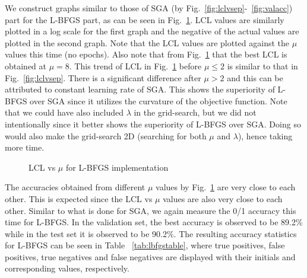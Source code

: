 \documentclass[a4paper]{article}
\begin{document}
We construct graphs similar to those of SGA (by Fig.~\ref{fig:lclvsep}-~\ref{fig:valacc}) part for the L-BFGS part, as can be seen in Fig.~\ref{fig:lbfgsglcl}. LCL values are similarly plotted in a log scale for the first graph and the negative of the actual values are plotted in the second graph. Note that the LCL values are plotted against the $\mu$ values this time (no epochs). Also note that from Fig.~\ref{fig:lbfgsglcl} that the best LCL is obtained at $\mu = 8$. This trend of LCL in Fig.~\ref{fig:lbfgsglcl} before $\mu \leq 2$ is similar to that in Fig.~\ref{fig:lclvsep}. There is a significant difference after $\mu > 2$ and this can be attributed to constant learning rate of SGA. This shows the superiority of L-BFGS over SGA since it utilizes the curvature of the objective function. Note that we could have also included $\lambda$ in the grid-search, but we did not intentionally since it better shows the superiority of L-BFGS over SGA. Doing so would also make the grid-search 2D (searching for both $\mu$ and $\lambda$), hence taking more time.\\

\begin{figure}
\caption{\label{fig:lbfgsglcl}LCL vs $\mu$ for L-BFGS implementation}
\end{figure}

The accuracies obtained from different $\mu$ values by Fig.~\ref{fig:lbfgsglcl} are very close to each other. This is expected since the LCL vs $\mu$ values are also very close to each other. Similar to what is done for SGA, we again measure the 0/1 accuracy this time for L-BFGS. In the validation set, the best accuracy is observed to be 89.2\% while in the test set it is observed to be 90.2\%. The resulting accuracy statistics for L-BFGS can be seen in Table ~\ref{tab:lbfgstable}, where true positives, false positives, true negatives and false negatives are displayed with their initials and corresponding values, respectively.\\
\end{document}
